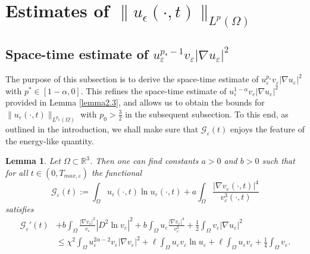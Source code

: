 \documentclass[12pt]{article}
\theoremstyle{plain}
\newtheorem{lemma}{Lemma}[section]
\theoremstyle{definition}
\numberwithin{equation}{section}
\begin{document}
\section{Estimates of $ \|u_{\epsilon}(\cdot,t)\|_{L^p(\Omega)}$ }\label{sec:3}
\subsection{Space-time estimate of $u_{\varepsilon}^{p_*-1}v_{\varepsilon}|\nabla u_{\varepsilon}|^2$}

The purpose of  this  subsection is to derive the
space-time estimate of $u_{\varepsilon}^{p_*}v_{\varepsilon}|\nabla u_{\varepsilon}|^2$ with $p^*\in [1-\alpha,0]$. This refines the space-time estimate of $u_{\varepsilon}^{1-\alpha}v_{\varepsilon}|\nabla u_{\varepsilon}|^2$ provided in Lemma \ref{lemma2.3},  and allows us to obtain the bounds for
$\|u_{\varepsilon}(\cdot,t)\|_{L^{p_0}(\Omega)}$ with $p_0>\frac{3}{2}$ in the subsequent subsection. To this end,
as outlined in the introduction,  we shall make sure that $\mathcal{ G_{\varepsilon}}(t)$ enjoys the feature of the  energy-like  quantity.
\begin{lemma}\label{lemma3.1}
Let $\Omega \subset \mathbb R^3$. Then one can find constants $a>0$ and $b>0$ such that for all $t\in (0,T_{max,\varepsilon})$ the functional
$$\mathcal{ G_{\varepsilon}} (t):=\int_{\Omega}u_{\varepsilon}(\cdot,t)\ln{u_{\varepsilon}(\cdot,t)}+a\int_{\Omega}\frac{|\nabla
v_{\varepsilon}(\cdot,t)|^4}{v_{\varepsilon}^{3}(\cdot,t)}$$ satisfies
\begin{align}\label{3.1}
 \mathcal{ G_{\varepsilon}}'(t)&+b\int_{\Omega}\frac{|\nabla
   v_{\varepsilon}|^{2}}{v_{\varepsilon}}|D^2\ln{v_{\varepsilon}}|^2+b\int_{\Omega}u_{\varepsilon}\frac{|\nabla
   v_{\varepsilon}|^4}{v_{\varepsilon}^3}+\frac{1}{2}\int_{\Omega}v_{\varepsilon}|\nabla u_{\varepsilon}|^2 \nonumber
    \\
    &\leq \chi^2\int_{\Omega}u_{\varepsilon}^{2\alpha-2}v_{\varepsilon}|\nabla v_{\varepsilon}|^2+\ell\int_{\Omega} u_{\varepsilon}
    v_{\varepsilon} \ln u_{\varepsilon}+\ell\int_{\Omega}u_{\varepsilon}v_{\varepsilon}+\frac{1}{4}\int_{\Omega}v_{\varepsilon}.
\end{align}
\end{lemma}
\end{document}
